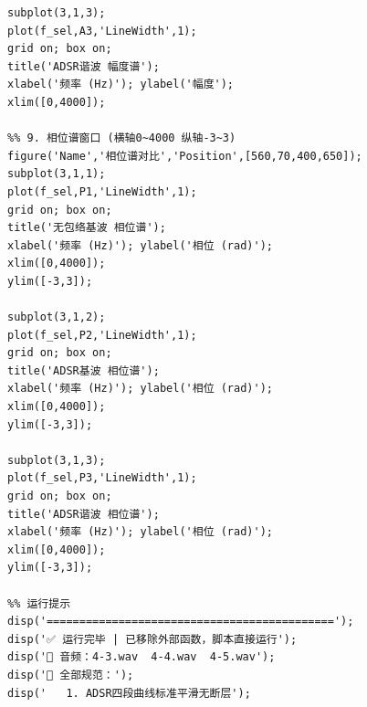 \begin{lstlisting}
subplot(3,1,3);
plot(f_sel,A3,'LineWidth',1);
grid on; box on;
title('ADSR谐波 幅度谱');
xlabel('频率 (Hz)'); ylabel('幅度');
xlim([0,4000]);

%% 9. 相位谱窗口 (横轴0~4000 纵轴-3~3)
figure('Name','相位谱对比','Position',[560,70,400,650]);
subplot(3,1,1);
plot(f_sel,P1,'LineWidth',1);
grid on; box on;
title('无包络基波 相位谱');
xlabel('频率 (Hz)'); ylabel('相位 (rad)');
xlim([0,4000]);
ylim([-3,3]);

subplot(3,1,2);
plot(f_sel,P2,'LineWidth',1);
grid on; box on;
title('ADSR基波 相位谱');
xlabel('频率 (Hz)'); ylabel('相位 (rad)');
xlim([0,4000]);
ylim([-3,3]);

subplot(3,1,3);
plot(f_sel,P3,'LineWidth',1);
grid on; box on;
title('ADSR谐波 相位谱');
xlabel('频率 (Hz)'); ylabel('相位 (rad)');
xlim([0,4000]);
ylim([-3,3]);

%% 运行提示
disp('============================================');
disp('✅ 运行完毕 | 已移除外部函数，脚本直接运行');
disp('📁 音频：4-3.wav  4-4.wav  4-5.wav');
disp('📌 全部规范：');
disp('   1. ADSR四段曲线标准平滑无断层');
\end{lstlisting}